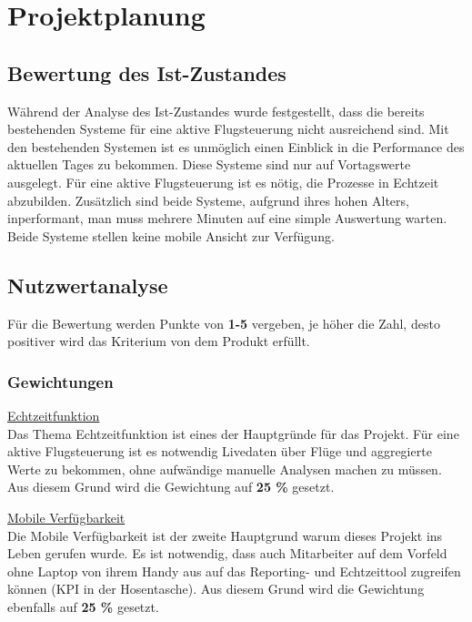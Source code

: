 \section{Projektplanung}

	\subsection{Bewertung des Ist-Zustandes}
	Während der Analyse des Ist-Zustandes wurde festgestellt, dass die bereits bestehenden Systeme für eine aktive Flugsteuerung nicht ausreichend sind. Mit den bestehenden Systemen ist es unmöglich einen Einblick in die Performance des aktuellen Tages zu bekommen. Diese Systeme sind nur auf Vortagswerte ausgelegt. Für eine aktive Flugsteuerung ist es nötig, die Prozesse in Echtzeit abzubilden. Zusätzlich sind beide Systeme, aufgrund ihres hohen Alters, inperformant, man muss mehrere Minuten auf eine simple Auswertung warten. Beide Systeme stellen keine mobile Ansicht zur Verfügung.


	
	\subsection{Nutzwertanalyse}
	Für die Bewertung werden Punkte von \textbf{1-5} vergeben, je höher die Zahl, desto positiver wird das Kriterium von dem Produkt erfüllt.

		\subsubsection{Gewichtungen}

		{
			\underline{Echtzeitfunktion}\\
			Das Thema Echtzeitfunktion ist eines der Hauptgründe für das Projekt. Für eine aktive Flugsteuerung ist es notwendig Livedaten über Flüge und aggregierte Werte zu bekommen, ohne aufwändige manuelle Analysen machen zu müssen. Aus diesem Grund wird die Gewichtung auf \textbf{25 \%} gesetzt.
		
		}

		\vspace{8pt}

		{
			\noindent
			\underline{Mobile Verfügbarkeit}\\
			Die Mobile Verfügbarkeit ist der zweite Hauptgrund warum dieses Projekt ins Leben gerufen wurde. Es ist notwendig, dass auch Mitarbeiter auf dem Vorfeld ohne Laptop von ihrem Handy aus auf das Reporting- und Echtzeittool zugreifen können (KPI in der Hosentasche). Aus diesem Grund wird die Gewichtung ebenfalls auf \textbf{25 \%} gesetzt.
		}

